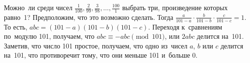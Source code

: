 \problem{}
Можно~ли среди чисел
$\frac{1}{100}, \frac{2}{99}, \frac{3}{98}, \ldots, \frac{100}{1}$
выбрать три, произведение которых равно~1?
\solution
Предположим, что это возможно сделать.
Тогда
\(
    \frac{a}{101 - a} \cdot \frac{b}{101 - b} \cdot
    \frac{c}{101 - c}
=
    1
\).
То есть, $a b c = (101 - a) (101 - b)(101 - c)$.
Переходя к~сравнениям по~модулю 101, получаем, что
$a b c \equiv - a b c \pmod{101}$, или $2 a b c$ делится на~101.
Заметив, что число 101 простое, получаем, что одно из~чисел
$a$, $b$ или $c$ делится на~101, что противоречит тому, что они
меньше 101 и~больше 0.
\endproblem
